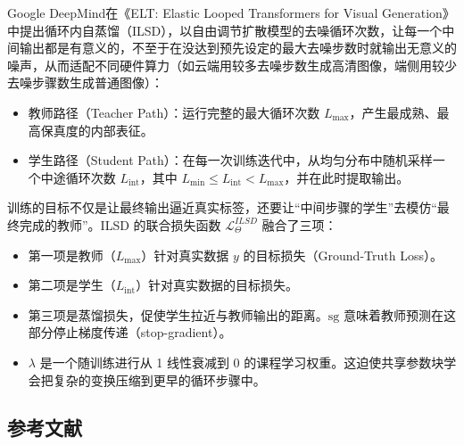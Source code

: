 Google DeepMind在《ELT: Elastic Looped Transformers for Visual Generation》中提出循环内自蒸馏（ILSD），以自由调节扩散模型的去噪循环次数，让每一个中间输出都是有意义的，不至于在没达到预先设定的最大去噪步数时就输出无意义的噪声，从而适配不同硬件算力（如云端用较多去噪步数生成高清图像，端侧用较少去噪步骤数生成普通图像）：

\begin{itemize}
\tightlist
\item
  教师路径（Teacher Path）：运行完整的最大循环次数 \(L_{\max}\)，产生最成熟、最高保真度的内部表征。
\item
  学生路径（Student Path）：在每一次训练迭代中，从均匀分布中随机采样一个中途循环次数 \(L_{\mathrm{int}}\)，其中 \(L_{\min}\le L_{\mathrm{int}}\lt L_{\max}\)，并在此时提取输出。
\end{itemize}

训练的目标不仅是让最终输出逼近真实标签，还要让``中间步骤的学生''去模仿``最终完成的教师''。ILSD 的联合损失函数 \(\mathcal{L}^{ILSD}_{\Theta}\) 融合了三项：

\begin{itemize}
\tightlist
\item
  第一项是教师（\(L_{\max}\)）针对真实数据 \(y\) 的目标损失（Ground-Truth Loss）。
\item
  第二项是学生（\(L_{\mathrm{int}}\)）针对真实数据的目标损失。
\item
  第三项是蒸馏损失，促使学生拉近与教师输出的距离。\(\mathrm{sg}\) 意味着教师预测在这部分停止梯度传递（stop-gradient）。
\item
  \(\lambda\) 是一个随训练进行从 1 线性衰减到 0 的课程学习权重。这迫使共享参数块学会把复杂的变换压缩到更早的循环步骤中。
\end{itemize}

\hypertarget{ux53c2ux8003ux6587ux732e-141}{%
\subsection{参考文献}\label{ux53c2ux8003ux6587ux732e-141}}

